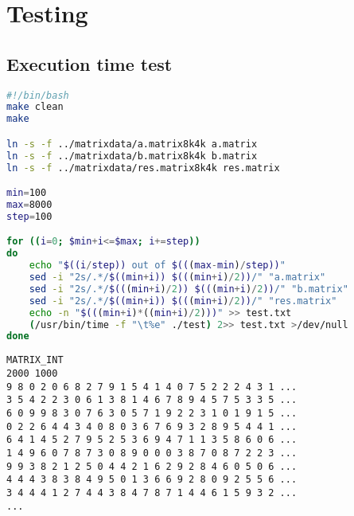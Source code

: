 \chapter{Testing}\label{app:testing}
\section{Execution time test}
\begin{lstlisting}[language=bash,caption={Bash script for automating execution time test},frame=tlrb]
#!/bin/bash
make clean
make

ln -s -f ../matrixdata/a.matrix8k4k a.matrix
ln -s -f ../matrixdata/b.matrix8k4k b.matrix
ln -s -f ../matrixdata/res.matrix8k4k res.matrix

min=100
max=8000
step=100

for ((i=0; $min+i<=$max; i+=step))
do
    echo "$((i/step)) out of $(((max-min)/step))"
    sed -i "2s/.*/$((min+i)) $(((min+i)/2))/" "a.matrix"
    sed -i "2s/.*/$(((min+i)/2)) $(((min+i)/2))/" "b.matrix"
    sed -i "2s/.*/$((min+i)) $(((min+i)/2))/" "res.matrix"
    echo -n "$(((min+i)*((min+i)/2)))" >> test.txt    
    (/usr/bin/time -f "\t%e" ./test) 2>> test.txt >/dev/null
done
\end{lstlisting}

\begin{lstlisting}[caption={Sample of file containing a matrix, some data omitted},frame=tlrb]
MATRIX_INT
2000 1000
9 8 0 2 0 6 8 2 7 9 1 5 4 1 4 0 7 5 2 2 2 4 3 1 ... 
3 5 4 2 2 3 0 6 1 3 8 1 4 6 7 8 9 4 5 7 5 3 3 5 ... 
6 0 9 9 8 3 0 7 6 3 0 5 7 1 9 2 2 3 1 0 1 9 1 5 ...
0 2 2 6 4 4 3 4 0 8 0 3 6 7 6 9 3 2 8 9 5 4 4 1 ...
6 4 1 4 5 2 7 9 5 2 5 3 6 9 4 7 1 1 3 5 8 6 0 6 ...
1 4 9 6 0 7 8 7 3 0 8 9 0 0 0 3 8 7 0 8 7 2 2 3 ...
9 9 3 8 2 1 2 5 0 4 4 2 1 6 2 9 2 8 4 6 0 5 0 6 ...
4 4 4 3 8 3 8 4 9 5 0 1 3 6 6 9 2 8 0 9 2 5 5 6 ...
3 4 4 4 1 2 7 4 4 3 8 4 7 8 7 1 4 4 6 1 5 9 3 2 ...
...
\end{lstlisting}

